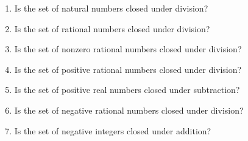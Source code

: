 \begin{enumerate}
\xitem \label{exer:sec11-8}%
\begin{enumerate}
\item Is the set of natural numbers closed under division?

\item Is the set of rational numbers closed under division?

\item Is the set of nonzero rational numbers closed under division?

\item Is the set of positive rational numbers closed under division?
\item Is the set of positive real numbers closed under subtraction?

\item Is the set of negative rational numbers closed under division?
\item Is the set of negative integers closed under addition?

\end{enumerate} \label{exer:closure}
\end{enumerate}


